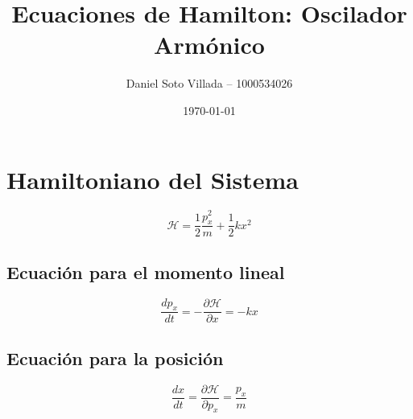 \documentclass[12pt,letterpaper]{article}
\title{Ecuaciones de Hamilton: Oscilador Armónico}
\author{Daniel Soto Villada -- 1000534026}
\date{\today}
\begin{document}
\maketitle

\section{Hamiltoniano del Sistema}

\begin{equation}
\mathcal{H} = \frac{1}{2}\frac{p_x^2}{m} + \frac{1}{2}kx^2
\end{equation}

\subsection{Ecuación para el momento lineal}

\begin{equation}
\frac{dp_x}{dt} = -\frac{\partial\mathcal{H}}{\partial x} = -kx
\end{equation}

\subsection{Ecuación para la posición}

\begin{equation}
\frac{dx}{dt} = \frac{\partial\mathcal{H}}{\partial p_x} = \frac{p_x}{m}
\end{equation}
\end{document}
